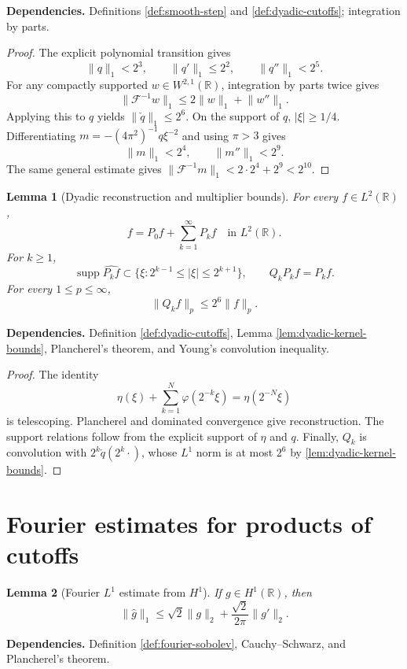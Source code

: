 \documentclass[11pt]{article}
\newtheorem{lemma}[lemma]{Lemma}
\theoremstyle{definition}
\theoremstyle{remark}
\newcommand{\R}{\mathbb R}
\newcommand{\supp}{\operatorname{supp}}
\newcommand{\1}{\mathbf 1}
\newcommand{\FT}[1]{\widehat{#1}}
\newcommand{\lpNorm}[2]{\lVert #1\rVert_{#2}}
\newcommand{\uses}[1]{\par\smallskip\noindent\textbf{Dependencies.} #1\par\smallskip}
\begin{document}
\uses{Definitions \ref{def:smooth-step} and \ref{def:dyadic-cutoffs}; integration by parts.}

\begin{proof}
The explicit polynomial transition gives
\[
\lpNorm q1<2^3,
\qquad
\lpNorm{q'}1\leq2^2,
\qquad
\lpNorm{q''}1<2^5.
\]
For any compactly supported $w\in W^{2,1}(\R)$, integration by parts twice gives
\[
\lpNorm{\mathcal F^{-1}w}1
\leq2\lpNorm w1+\lpNorm{w''}1.
\]
Applying this to $q$ yields $\lpNorm{\check q}1\leq2^6$.
On the support of $q$, $|\xi|\geq1/4$.  Differentiating
$m=-(4\pi^2)^{-1}q\xi^{-2}$ and using $\pi>3$ gives
\[
\lpNorm m1<2^4,
\qquad
\lpNorm{m''}1<2^9.
\]
The same general estimate gives
$\lpNorm{\mathcal F^{-1}m}1<2\cdot2^4+2^9<2^{10}$.
\end{proof}

\begin{lemma}[Dyadic reconstruction and multiplier bounds]\label{lem:dyadic-reconstruction}
For every $f\in L^2(\R)$,
\[
f=P_0f+\sum_{k=1}^\infty P_kf
\quad\text{in }L^2(\R).
\]
For $k\geq1$,
\[
\supp\FT{P_kf}\subset\{\xi:2^{k-1}\leq|\xi|\leq2^{k+1}\},
\qquad
Q_kP_kf=P_kf.
\]
For every $1\leq p\leq\infty$,
\[
\lpNorm{Q_kf}p\leq2^6\lpNorm fp.
\]
\end{lemma}

\uses{Definition \ref{def:dyadic-cutoffs}, Lemma \ref{lem:dyadic-kernel-bounds}, Plancherel's theorem, and Young's convolution inequality.}

\begin{proof}
The identity
\[
\eta(\xi)+\sum_{k=1}^N\varphi(2^{-k}\xi)=\eta(2^{-N}\xi)
\]
is telescoping.  Plancherel and dominated convergence give reconstruction.  The support relations follow from the explicit support of $\eta$ and $q$.  Finally, $Q_k$ is convolution with
$2^k\check q(2^k\cdot)$, whose $L^1$ norm is at most $2^6$ by \cref{lem:dyadic-kernel-bounds}.
\end{proof}

\section{Fourier estimates for products of cutoffs}

\begin{lemma}[Fourier $L^1$ estimate from $H^1$]\label{lem:fourier-l1-h1}
If $g\in H^1(\R)$, then
\[
\lpNorm{\FT g}1
\leq
\sqrt2\lpNorm g2+\frac{\sqrt2}{2\pi}\lpNorm{g'}2.
\]
\end{lemma}

\uses{Definition \ref{def:fourier-sobolev}, Cauchy--Schwarz, and Plancherel's theorem.}
\end{document}
